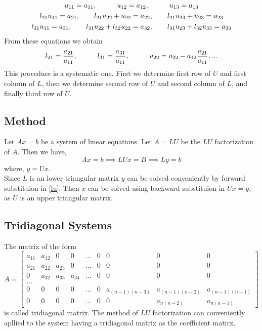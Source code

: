 \documentclass[aima203_lecturenotes_ku.tex]{subfiles}
\begin{document}
\begin{gather*}
  u_{11} = a_{11}, \hspace{10mm} u_{12}=a_{12}, \hspace{10mm} u_{13}=a_{13} \\
  l_{21}u_{11} = a_{21}, \hspace{7mm} l_{21}u_{22} + u_{22} =a_{22}, \hspace{7mm} l_{21}u_{23} + u_{23}=a_{23} \\
  l_{31}u_{11} = a_{31}, \hspace{7mm} l_{31}u_{22}+ l_{32}u_{22}=a_{32}, \hspace{7mm} l_{31}u_{23}+ l_{32}u_{33}=a_{33}
\end{gather*}
From these equations we obtain
\begin{equation}
  \begin{gathered}
    l_{21} = \frac{a_{21}}{a_{11}},\hspace{10mm} l_{31} = \frac{a_{31}}{a_{11}}, \hspace{1cm}  u_{22} = a_{22} - a_{12}\frac{a_{21}}{a_{11}}, ...
  \end{gathered}
\end{equation}
This procedure is a systematic one. First we determine first row of $U$ and first column of $L$, then we determine second row of $U$ and second column of $L$, and finally third row of $U$.

\subsection{Method}
Let $Ax=b$ be a system of linear equations. Let $A=LU$ be the $LU$ factorization of $A$. Then we have,
\begin{equation}
  \label{lu}
  Ax=b \implies LUx=B \implies Ly=b
\end{equation}
where, $y=Ux$. \\
Since $L$ is an lower triangular matrix $y$ can be solved conveniently by forward substituion in \ref{lu}. Then $x$ can be solved using backward substituion in $Ux=y$, as $U$ is an upper triangular matrix.

\subsection{Tridiagonal Systems}
The matrix of the form $$A= \begin{bmatrix}
    a_{11} & a_{12} & 0 & 0 &... & 0 & 0 & 0 & 0\\
    a_{21} & a_{22} & a_{23} & 0 &... & 0 &0 &0 & 0\\
    0 & a_{32} & a_{33} & a_{34} &... & 0 & 0 &0 & 0\\
    ...\\
    0 & 0 & 0 & 0 &...& 0 & a_{(n-1)(n-3)} & a_{(n-1)(n-2)} & a_{(n-1)(n-1)} \\
    0 & 0 & 0 & 0&... & 0 & 0 & a_{n(n-2)} & a_{n(n-1)}
\end{bmatrix}$$ is called tridiagonal matrix.
The method of $LU$ factorization can conveniently apllied to the system having a tridiagonal matrix as the coefficient matirx.
\end{document}

